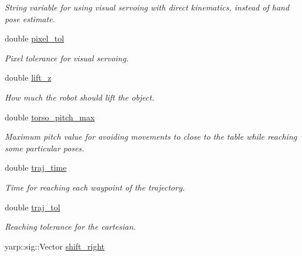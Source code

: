 \begin{DoxyCompactItemize}
\begin{DoxyCompactList}\small\item\em String variable for using visual servoing with direct kinematics, instead of hand pose estimate. \end{DoxyCompactList}\item 
double \hyperlink{classGraspingModule_aa84058eee1411f35aa489b9cad9f9371}{pixel\+\_\+tol}\label{classGraspingModule_aa84058eee1411f35aa489b9cad9f9371}

\begin{DoxyCompactList}\small\item\em Pixel tolerance for visual servoing. \end{DoxyCompactList}\item 
double \hyperlink{classGraspingModule_a676c7aa895de03ba5362a309cd669905}{lift\+\_\+z}\label{classGraspingModule_a676c7aa895de03ba5362a309cd669905}

\begin{DoxyCompactList}\small\item\em How much the robot should lift the object. \end{DoxyCompactList}\item 
double \hyperlink{classGraspingModule_af1feeb0f4397d83491831327e05c8b44}{torso\+\_\+pitch\+\_\+max}\label{classGraspingModule_af1feeb0f4397d83491831327e05c8b44}

\begin{DoxyCompactList}\small\item\em Maximum pitch value for avoiding movements to close to the table while reaching some particular poses. \end{DoxyCompactList}\item 
double \hyperlink{classGraspingModule_a02accb5392fe0877a2a98febbcf20ea6}{traj\+\_\+time}\label{classGraspingModule_a02accb5392fe0877a2a98febbcf20ea6}

\begin{DoxyCompactList}\small\item\em Time for reaching each waypoint of the trajectory. \end{DoxyCompactList}\item 
double \hyperlink{classGraspingModule_a2b59e1c09ae51bb1829cb4b73799a9d2}{traj\+\_\+tol}\label{classGraspingModule_a2b59e1c09ae51bb1829cb4b73799a9d2}

\begin{DoxyCompactList}\small\item\em Reaching tolerance for the cartesian. \end{DoxyCompactList}\item 
yarp\+::sig\+::\+Vector \hyperlink{classGraspingModule_a589b2e394e0d255fcd23734b911392ef}{shift\+\_\+right}\label{classGraspingModule_a589b2e394e0d255fcd23734b911392ef}


\end{DoxyCompactItemize}
